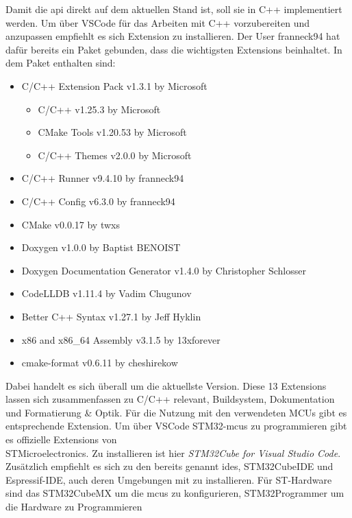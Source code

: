 Damit die \gls{api} direkt auf dem aktuellen Stand ist, soll sie in C++ implementiert werden.
Um über VSCode für das Arbeiten mit C++ vorzubereiten und anzupassen empfiehlt es sich Extension zu installieren.
Der User franneck94 hat dafür bereits ein Paket gebunden, dass die wichtigsten Extensions beinhaltet.
In dem Paket enthalten sind:
\begin{itemize}
	\item C/C++ Extension Pack  v1.3.1 by Microsoft
	\begin{itemize}
		\item C/C++  v1.25.3  by Microsoft		
		\item CMake Tools  v1.20.53  by Microsoft
		\item C/C++ Themes  v2.0.0 by Microsoft 
	\end{itemize}
	\item C/C++ Runner  v9.4.10 by franneck94
	\item C/C++ Config  v6.3.0 by franneck94
	\item CMake  v0.0.17 by twxs
	\item Doxygen  v1.0.0 by Baptist BENOIST
	\item Doxygen Documentation Generator  v1.4.0 by Christopher Schlosser
	\item CodeLLDB  v1.11.4 by Vadim Chugunov
	\item Better C++ Syntax  v1.27.1  by Jeff Hyklin
	\item x86 and x86\_64 Assembly  v3.1.5 by 13xforever
	\item cmake-format  v0.6.11 by cheshirekow
\end{itemize}

Dabei handelt es sich überall um die aktuellste Version.
Diese 13 Extensions lassen sich zusammenfassen zu C/C++ relevant, Buildsystem, Dokumentation und Formatierung \& Optik.
Für die Nutzung mit den verwendeten MCUs gibt es entsprechende Extension.
Um über VSCode STM32-\gls{mcu}s zu programmieren gibt es offizielle Extensions von\\STMicroelectronics.
Zu installieren ist hier \emph{STM32Cube for Visual Studio Code}.
Zusätzlich empfiehlt es sich zu den bereits genannt \gls{ide}s, STM32CubeIDE und Espressif-IDE, auch deren Umgebungen mit zu installieren.
Für ST-Hardware sind das STM32CubeMX um die \gls{mcu}s zu konfigurieren, STM32Programmer um die Hardware zu Programmieren %

